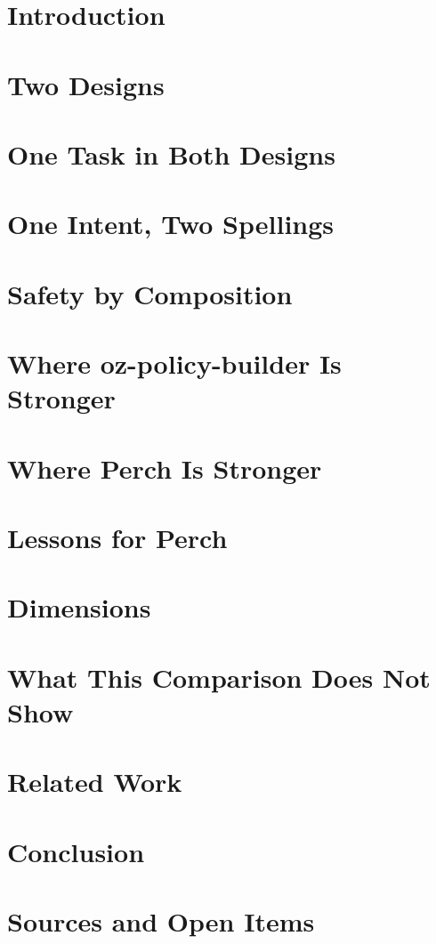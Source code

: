 \section{Introduction}\label{sec:overview}

\section{Two Designs}\label{sec:designs}

\section{One Task in Both Designs}\label{sec:same-task}

\section{One Intent, Two Spellings}\label{sec:spellings}

\section{Safety by Composition}\label{sec:composition}

\section{Where oz-policy-builder Is Stronger}\label{sec:opb-stronger}

\section{Where Perch Is Stronger}\label{sec:perch-stronger}

\section{Lessons for Perch}\label{sec:lessons}

\section{Dimensions}\label{sec:dimensions}

\section{What This Comparison Does Not Show}\label{sec:limits}

\section{Related Work}\label{sec:related}

\section{Conclusion}\label{sec:conclusion}

\appendix
\section{Sources and Open Items}\label{sec:sources}

